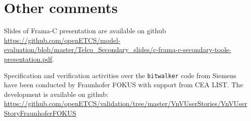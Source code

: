 \section{Other comments}

Slides of Frama-C presentation are available on github
\url{https://github.com/openETCS/model-evaluation/blob/master/Telco_Secondary_slides/c-frama-c-secondary-tools-presentation.pdf}.

Specification and verification activities over the \texttt{bitwalker} code from
Siemens have been conducted by Fraunhofer FOKUS with support from CEA LIST.
The development is available on github: \url{https://github.com/openETCS/validation/tree/master/VnVUserStories/VnVUserStoryFraunhoferFOKUS}